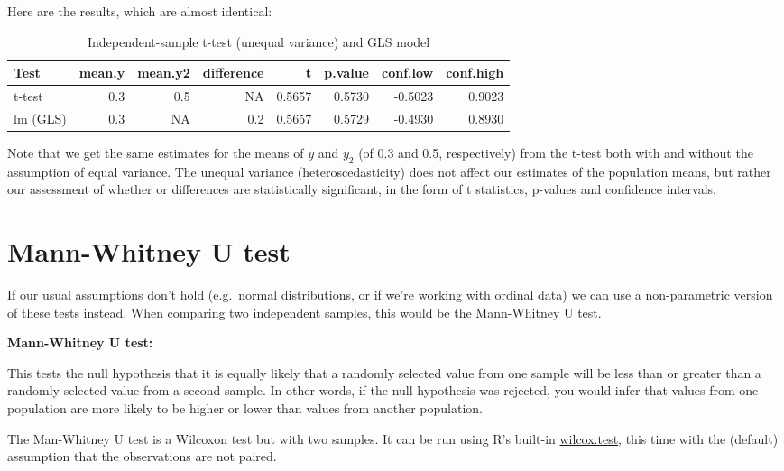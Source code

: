 \documentclass[
  12pt,
]{krantz}
\begin{document}
Here are the results, which are almost identical:

\begin{table}

\caption{\label{tab:unnamed-chunk-33}Independent-sample t-test (unequal variance) and GLS model}
\centering
\begin{tabular}[t]{lrrrrrrr}
\toprule
Test & mean.y & mean.y2 & difference & t & p.value & conf.low & conf.high\\
\midrule
t-test & 0.3 & 0.5 & NA & 0.5657 & 0.5730 & -0.5023 & 0.9023\\
lm (GLS) & 0.3 & NA & 0.2 & 0.5657 & 0.5729 & -0.4930 & 0.8930\\
\bottomrule
\end{tabular}
\end{table}

Note that we get the same estimates for the means of \(y\) and \(y_2\) (of 0.3 and 0.5, respectively) from the t-test both with and without the assumption of equal variance. The unequal variance (heteroscedasticity) does not affect our estimates of the population means, but rather our assessment of whether or differences are statistically significant, in the form of t statistics, p-values and confidence intervals.

\hypertarget{mann-whitney-u-test}{%
\section{Mann-Whitney U test}\label{mann-whitney-u-test}}

If our usual assumptions don't hold (e.g.~normal distributions, or if we're working with ordinal data) we can use a non-parametric version of these tests instead. When comparing two independent samples, this would be the Mann-Whitney U test.

\textbf{Mann-Whitney U test:}

This tests the null hypothesis that it is equally likely that a randomly selected value from one sample will be less than or greater than a randomly selected value from a second sample. In other words, if the null hypothesis was rejected, you would infer that values from one population are more likely to be higher or lower than values from another population.

The Man-Whitney U test is a Wilcoxon test but with two samples. It can be run using R's built-in \href{https://www.rdocumentation.org/packages/stats/versions/3.5.3/topics/wilcox.test}{wilcox.test}, this time with the (default) assumption that the observations are not paired.
\end{document}
